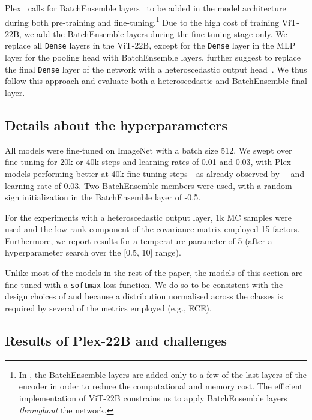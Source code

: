 \documentclass{article}
\begin{document}
Plex~\citep{tran2022plex} calls for BatchEnsemble layers~\citep{wen2019batchensemble} to be added
in
the model architecture during both pre-training and fine-tuning.\footnote{In \citet{tran2022plex}, the BatchEnsemble layers are added only to a few of the last layers of the encoder in order to reduce the computational and memory cost. The efficient implementation of ViT-22B constrains us to apply BatchEnsemble layers \textit{throughout} the network.} Due to the high cost of training ViT-22B, we add the BatchEnsemble layers during the fine-tuning stage only. We replace all \texttt{Dense} layers in the ViT-22B, except for the \texttt{Dense} layer in the MLP layer for the pooling head with BatchEnsemble layers. \citet{tran2022plex} further suggest to replace the final \texttt{Dense} layer of the network with a heteroscedastic output head~\citep{collier2021correlated}. We thus follow this approach and evaluate both a heteroscedastic and BatchEnsemble final layer.

\subsection{Details about the hyperparameters}

All models were fine-tuned on ImageNet with a batch size 512. We swept over fine-tuning for 20k or 40k steps and learning rates of 0.01 and 0.03, with Plex models performing better at 40k fine-tuning steps---as already observed by \citet{tran2022plex}---and learning rate of 0.03. Two BatchEnsemble members were used, with a random sign initialization in the BatchEnsemble layer of -0.5.

For the experiments with a heteroscedastic output layer, 1k MC samples were used and the low-rank component of the covariance matrix employed 15 factors. Furthermore, we report results for a temperature parameter of 5 (after a hyperparameter search over the [0.5, 10] range).

Unlike most of the models in the rest of the paper, the models of this section are fine tuned with a \texttt{softmax} loss function. We do so to be consistent with the design choices of \citet{tran2022plex} and because a distribution normalised across the classes is required by several of the metrics employed (e.g., ECE). 

\subsection{Results of Plex-22B and challenges}
\end{document}
